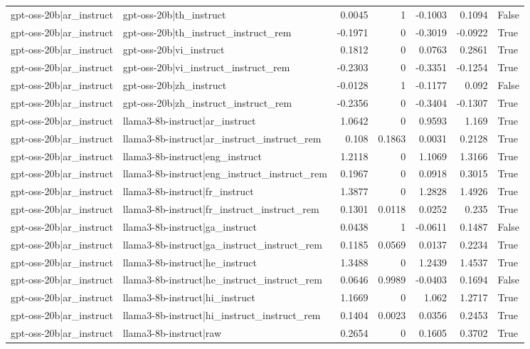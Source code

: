 \begin{table}
\begin{tabular}{l l r r r r l}
gpt-oss-20b|ar_instruct & gpt-oss-20b|th_instruct & 0.0045 & 1 & -0.1003 & 0.1094 & False \\
gpt-oss-20b|ar_instruct & gpt-oss-20b|th_instruct_instruct_rem & -0.1971 & 0 & -0.3019 & -0.0922 & True \\
gpt-oss-20b|ar_instruct & gpt-oss-20b|vi_instruct & 0.1812 & 0 & 0.0763 & 0.2861 & True \\
gpt-oss-20b|ar_instruct & gpt-oss-20b|vi_instruct_instruct_rem & -0.2303 & 0 & -0.3351 & -0.1254 & True \\
gpt-oss-20b|ar_instruct & gpt-oss-20b|zh_instruct & -0.0128 & 1 & -0.1177 & 0.092 & False \\
gpt-oss-20b|ar_instruct & gpt-oss-20b|zh_instruct_instruct_rem & -0.2356 & 0 & -0.3404 & -0.1307 & True \\
gpt-oss-20b|ar_instruct & llama3-8b-instruct|ar_instruct & 1.0642 & 0 & 0.9593 & 1.169 & True \\
gpt-oss-20b|ar_instruct & llama3-8b-instruct|ar_instruct_instruct_rem & 0.108 & 0.1863 & 0.0031 & 0.2128 & True \\
gpt-oss-20b|ar_instruct & llama3-8b-instruct|eng_instruct & 1.2118 & 0 & 1.1069 & 1.3166 & True \\
gpt-oss-20b|ar_instruct & llama3-8b-instruct|eng_instruct_instruct_rem & 0.1967 & 0 & 0.0918 & 0.3015 & True \\
gpt-oss-20b|ar_instruct & llama3-8b-instruct|fr_instruct & 1.3877 & 0 & 1.2828 & 1.4926 & True \\
gpt-oss-20b|ar_instruct & llama3-8b-instruct|fr_instruct_instruct_rem & 0.1301 & 0.0118 & 0.0252 & 0.235 & True \\
gpt-oss-20b|ar_instruct & llama3-8b-instruct|ga_instruct & 0.0438 & 1 & -0.0611 & 0.1487 & False \\
gpt-oss-20b|ar_instruct & llama3-8b-instruct|ga_instruct_instruct_rem & 0.1185 & 0.0569 & 0.0137 & 0.2234 & True \\
gpt-oss-20b|ar_instruct & llama3-8b-instruct|he_instruct & 1.3488 & 0 & 1.2439 & 1.4537 & True \\
gpt-oss-20b|ar_instruct & llama3-8b-instruct|he_instruct_instruct_rem & 0.0646 & 0.9989 & -0.0403 & 0.1694 & False \\
gpt-oss-20b|ar_instruct & llama3-8b-instruct|hi_instruct & 1.1669 & 0 & 1.062 & 1.2717 & True \\
gpt-oss-20b|ar_instruct & llama3-8b-instruct|hi_instruct_instruct_rem & 0.1404 & 0.0023 & 0.0356 & 0.2453 & True \\
gpt-oss-20b|ar_instruct & llama3-8b-instruct|raw & 0.2654 & 0 & 0.1605 & 0.3702 & True \\

\end{tabular}
\end{table}
